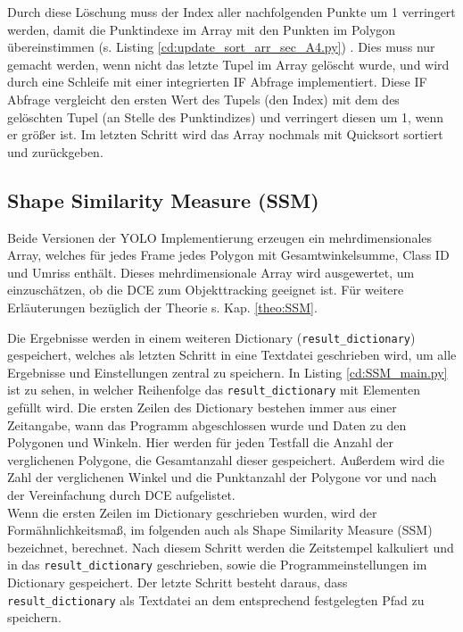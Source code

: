 {	\fi Durch diese Löschung muss der Index aller nachfolgenden Punkte um 1 verringert werden, damit die Punktindexe im Array mit den Punkten im Polygon übereinstimmen \ifimportant (s. Listing \ref{cd:update_sort_arr_sec_A4.py}) \fi. Dies muss nur gemacht werden, wenn nicht das letzte Tupel im Array gelöscht wurde, und wird durch eine Schleife mit einer integrierten IF Abfrage implementiert. Diese IF Abfrage vergleicht den ersten Wert des Tupels (den Index) mit dem des gelöschten Tupel (an Stelle des Punktindizes) und verringert diesen um 1, wenn er größer ist.
	Im letzten Schritt wird das Array nochmals mit Quicksort sortiert und zurückgeben.
	
}


\subsection{Shape Similarity Measure (SSM)}{
	\label{py:Shape_Sim_Meas}
	Beide Versionen der YOLO Implementierung erzeugen ein mehrdimensionales Array, welches für jedes Frame jedes Polygon mit Gesamtwinkelsumme, Class ID und Umriss enthält. Dieses mehrdimensionale Array wird ausgewertet, um einzuschätzen, ob die DCE zum Objekttracking geeignet ist. Für weitere Erläuterungen bezüglich der Theorie s. Kap. \ref{theo:SSM}. \\
	\ifimportant
	
	\fi

	Die Ergebnisse werden in einem weiteren Dictionary (\lstinline|result_dictionary|) gespeichert, welches als letzten Schritt in eine Textdatei geschrieben wird, um alle Ergebnisse und Einstellungen zentral zu speichern. \ifimportant In Listing \ref{cd:SSM_main.py} ist zu sehen, in welcher Reihenfolge das \lstinline|result_dictionary| mit Elementen gefüllt wird. \fi Die ersten Zeilen des Dictionary bestehen immer aus einer Zeitangabe, wann das Programm abgeschlossen wurde und Daten zu den Polygonen und Winkeln. Hier werden für jeden Testfall die Anzahl der verglichenen Polygone, die Gesamtanzahl dieser gespeichert. Außerdem wird die Zahl der verglichenen Winkel und die Punktanzahl der Polygone vor und nach der Vereinfachung durch DCE aufgelistet. \\
	Wenn die ersten Zeilen im Dictionary geschrieben wurden, wird der Formähnlichkeitsmaß, im folgenden auch als \glqq Shape Similarity Measure\grqq{} (SSM) bezeichnet, berechnet. Nach diesem Schritt werden die Zeitstempel kalkuliert und in das \lstinline|result_dictionary| geschrieben, sowie die Programmeinstellungen im Dictionary gespeichert. Der letzte Schritt besteht daraus, dass \lstinline|result_dictionary| als Textdatei an dem entsprechend festgelegten Pfad zu speichern. \\
	\ifimportant
	 
	\fi

}
